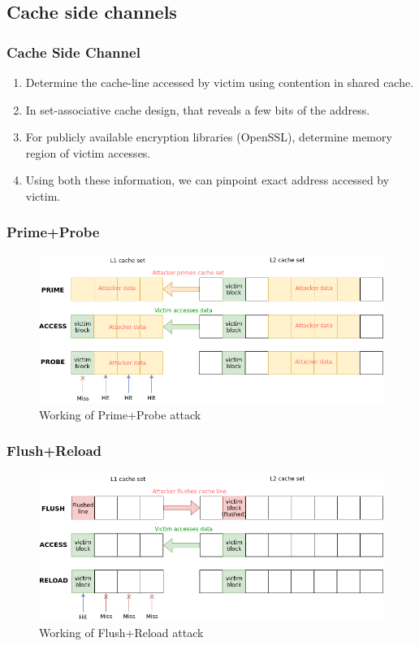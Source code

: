 \documentclass[10pt,usenames,dvipsnames]{beamer}
\begin{document}
\subsection{Cache side channels}
\begin{frame}
\frametitle{Cache Side Channel}
\begin{enumerate}
    \item Determine the cache-line accessed by victim using contention in shared cache.
    \item In set-associative cache design, that reveals a few bits of the address.
    \item For publicly available encryption libraries (OpenSSL), determine memory region of victim accesses.
    \item Using both these information, we can pinpoint exact address accessed by victim.
\end{enumerate}
\end{frame}

\begin{frame}
\frametitle{Prime+Probe}
\begin{figure}
\includegraphics[width=\textwidth]{prime_probe}
\caption{Working of Prime+Probe attack}
\end{figure}
\end{frame}

\begin{frame}
\frametitle{Flush+Reload}
\begin{figure}
\includegraphics[width=\textwidth]{flush_reload}
\caption{Working of Flush+Reload attack}
\end{figure}
\end{frame}
\end{document}
